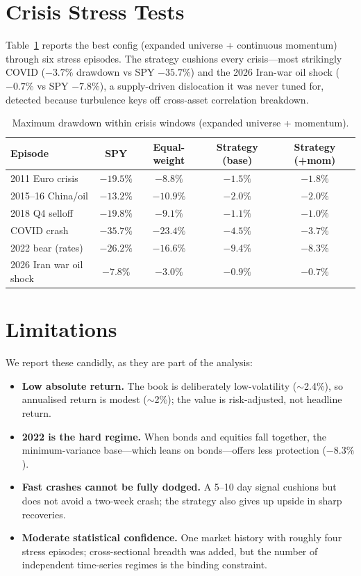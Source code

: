 \documentclass[11pt]{article}
\begin{document}
\section{Crisis Stress Tests}
Table~\ref{tab:stress} reports the best config (expanded universe + continuous momentum) through six
stress episodes. The strategy cushions every crisis---most strikingly COVID ($-3.7\%$ drawdown vs SPY
$-35.7\%$) and the 2026 Iran-war oil shock ($-0.7\%$ vs SPY $-7.8\%$), a supply-driven dislocation it
was never tuned for, detected because turbulence keys off cross-asset correlation breakdown.

\begin{table}[h]\centering
\caption{Maximum drawdown within crisis windows (expanded universe + momentum).}\label{tab:stress}
\begin{tabular}{lcccc}
\toprule
Episode & SPY & Equal-weight & Strategy (base) & Strategy (+mom) \\
\midrule
2011 Euro crisis        & $-19.5\%$ & $-8.8\%$  & $-1.5\%$  & $-1.8\%$ \\
2015--16 China/oil      & $-13.2\%$ & $-10.9\%$ & $-2.0\%$  & $-2.0\%$ \\
2018 Q4 selloff         & $-19.8\%$ & $-9.1\%$  & $-1.1\%$  & $-1.0\%$ \\
COVID crash             & $-35.7\%$ & $-23.4\%$ & $-4.5\%$  & $-3.7\%$ \\
2022 bear (rates)       & $-26.2\%$ & $-16.6\%$ & $-9.4\%$  & $-8.3\%$ \\
2026 Iran war oil shock & $-7.8\%$  & $-3.0\%$  & $-0.9\%$  & $-0.7\%$ \\
\bottomrule
\end{tabular}
\end{table}

\section{Limitations}
We report these candidly, as they are part of the analysis:
\begin{itemize}[nosep]
  \item \textbf{Low absolute return.} The book is deliberately low-volatility ($\sim$2.4\%), so
  annualised return is modest ($\sim$2\%); the value is risk-adjusted, not headline return.
  \item \textbf{2022 is the hard regime.} When bonds and equities fall together, the
  minimum-variance base---which leans on bonds---offers less protection ($-8.3\%$).
  \item \textbf{Fast crashes cannot be fully dodged.} A 5--10 day signal cushions but does not avoid
  a two-week crash; the strategy also gives up upside in sharp recoveries.
  \item \textbf{Moderate statistical confidence.} One market history with roughly four stress
  episodes; cross-sectional breadth was added, but the number of independent time-series regimes is
  the binding constraint.
\end{itemize}
\end{document}
